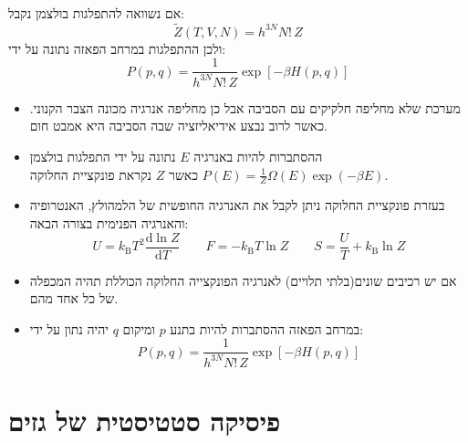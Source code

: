 \documentclass{tstextbook}
\begin{document}
\begin{corollary}
אם נשוואה להתפלגות בולצמן נקבל:
$$\tilde{Z}(T,V,N)=h^{3N}N!\,Z$$
ולכן ההתפלגות במרחב הפאזה נתונה על ידי:
$$P(p,q)=\frac{1}{h^{3N}N!\,Z}\exp[-\beta H(p,q)]$$

\end{corollary}
\begin{summary}
  \begin{itemize}
    \item מערכת שלא מחליפה חלקיקים עם הסביבה אבל כן מחליפה אנרגיה מכונה הצבר הקנוני. כאשר לרוב נבצע אידיאליזציה שבה הסביבה היא אמבט חום.
    \item ההסתברות להיות באנרגיה \(E\) נתונה על ידי התפלגות בולצמן \(P(E)=\frac{1}{Z}\Omega(E)\exp(-\beta E)\) כאשר \(Z\) נקראת פונקציית החלוקה.
    \item בעזרת פונקציית החלוקה ניתן לקבל את האנרגיה החופשית של הלמהולץ, האנטרופיה והאנרגיה הפנימית בצורה הבאה:
$$U=k_{\mathrm{B}}T^{2}{\frac{\mathrm{d}\ln Z}{\mathrm{d}T}} \qquad F=-k_{\mathrm{B}}T\ln Z \qquad S={\frac{U}{T}}+k_{\mathrm{B}}\ln Z
$$
    \item אם יש רכיבים שונים(בלתי תלויים) לאנרגיה הפונקצייה החלוקה הכוללת תהיה המכפלה של כל אחד מהם.
    \item במרחב הפאזה ההסתברות להיות בתנע \(p\) ומיקום \(q\) יהיה נתון על ידי:
$$P(p,q)=\frac{1}{h^{3N}N!\,Z}\exp[-\beta H(p,q)]$$
  \end{itemize}
\end{summary}
\section{פיסיקה סטטיסטית של גזים}
\end{document}
